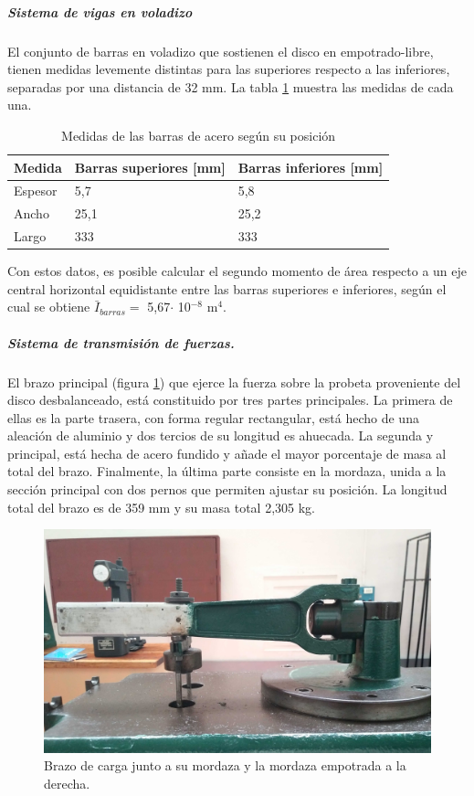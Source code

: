 \subparagraph{Sistema de vigas en voladizo}
El conjunto de barras en voladizo que sostienen el disco en empotrado-libre, tienen medidas levemente distintas para las superiores respecto a las inferiores, separadas por una distancia de 32 mm. La tabla \ref{tab:medidas_barrasacero} muestra las medidas de cada una.
\begin{table}[h]
\centering
\begin{tabular}{@{}lll@{}}
\toprule
Medida  & Barras superiores {[}mm{]} & Barras inferiores {[}mm{]} \\ \midrule
Espesor      & 5,7                        & 5,8                        \\
Ancho        & 25,1                       & 25,2                       \\
Largo        & 333                        & 333                        \\ \bottomrule
\end{tabular}
\caption{Medidas de las barras de acero según su posición}
\label{tab:medidas_barrasacero}
\end{table}

Con estos datos, es posible calcular el segundo momento de área respecto a un eje central horizontal equidistante entre las barras superiores e inferiores, según el cual se obtiene $\bar{I}_{barras}=$ 5,67$\cdot$ 10$^{-8} \text{ m}^4$. 

\subparagraph{Sistema de transmisión de fuerzas.}
El brazo principal (figura \ref{fig:brazo_carga}) que ejerce la fuerza sobre la probeta proveniente del disco desbalanceado, está constituido por tres partes principales. La primera de ellas es la parte trasera, con forma regular rectangular, está hecho de una aleación de aluminio y dos tercios de su longitud es ahuecada. La segunda y principal, está hecha de acero fundido y añade el mayor porcentaje de masa al total del brazo. Finalmente, la última parte consiste en la mordaza, unida a la sección principal con dos pernos que permiten ajustar su posición. La longitud total del brazo es de 359 mm y su masa total 2,305 kg.

\begin{figure}[h]
\centering
\includegraphics[width=0.9\linewidth]{Imagenes/brazo_carga.jpg}
\caption{Brazo de carga junto a su mordaza y la mordaza empotrada a la derecha.}
\label{fig:brazo_carga}
\end{figure}

